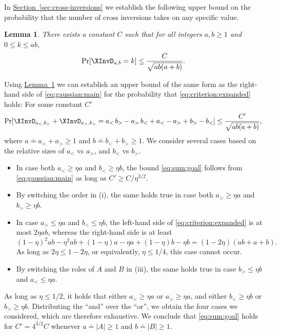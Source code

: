 \documentclass[11pt]{article}
\numberwithin{equation}{section}
\newtheorem{lemma}[theorem]{Lemma}
\theoremstyle{definition}
\theoremstyle{plain}
\newcommand{\expref}[2]{\hyperref[#2]{#1~\ref{#2}}}
\begin{document}
In \expref{Section}{sec:cross-inversions} we establish the following upper bound on the probability that the number of cross inversions takes on any specific value.
\begin{lemma}\label{thm:gaussian:main}
There exists a constant $C$ such that for all integers $a,b\ge 1$ and $0\le k\le ab$, 
\begin{equation}\label{eq:gaussian:main}
\Pr[\XInvD_{a,b}=k]\le \frac{C}{\sqrt{ab(a+b)}}. 
\end{equation}
\end{lemma}
Using \expref{Lemma}{thm:gaussian:main} we can establish an upper bound of the same form as the right-hand side of \eqref{eq:gaussian:main} for the probability that \eqref{eq:criterion:expanded} holds: For some constant $C'$
\begin{equation}\label{eq:sum:goal}
\Pr[ \XInvD_{a_<,b_<} + \XInvD_{a_>,b_>} = a_< \, b_> - a_> \, b_< + a_< - a_> + b_> - b_<] \le \frac{C'}{\sqrt{ab(a+b)}}, 
\end{equation}
where $a \doteq a_< + a_> \ge 1$ and $b \doteq b_< + b_> \ge 1$.
We consider several cases based on the relative sizes of $a_<$ vs $a_>$, and $b_<$ vs $b_>$.
\begin{itemize}
\item[(i)] In case both $a_< \ge \eta a$ and $b_< \ge \eta b$, the bound \eqref{eq:sum:goal} follows from \eqref{eq:gaussian:main} as long as $C' \ge C / \eta^{3/2}$. 
\item[(ii)] By switching the order in (i), the same holds true in case both $a_> \ge \eta a$ and $b_> \ge \eta b$.
\item[(iii)] In case $a_> \le \eta a$ and $b_< \le \eta b$, the left-hand side of \eqref{eq:criterion:expanded} is at most $2 \eta ab$, whereas the right-hand side is at least
\[ (1-\eta)^2 ab - \eta^2 ab + (1-\eta)a - \eta a + (1-\eta)b - \eta b 
= (1-2\eta)(ab+a+b). \]
As long as $2 \eta \le 1-2\eta$, or equivalently, $\eta \le 1/4$, this case cannot occur.
\item[(iv)] By switching the roles of $A$ and $B$ in (iii), the same holds true in case $b_> \le \eta b$ and $a_< \le \eta a$.
\end{itemize}
As long as $\eta \le 1/2$, it holds that either $a_< \ge \eta a$ or $a_> \ge \eta a$, and either $b_< \ge \eta b$ or $b_> \ge \eta b$. 
Distributing the “and” over the “or”, we obtain the four cases we considered, which are therefore exhaustive. We conclude that \eqref{eq:sum:goal} holds for $C' = 4^{3/2} C$ whenever $a \doteq |A| \ge 1$ and $b \doteq |B| \ge 1$. 
\end{document}
